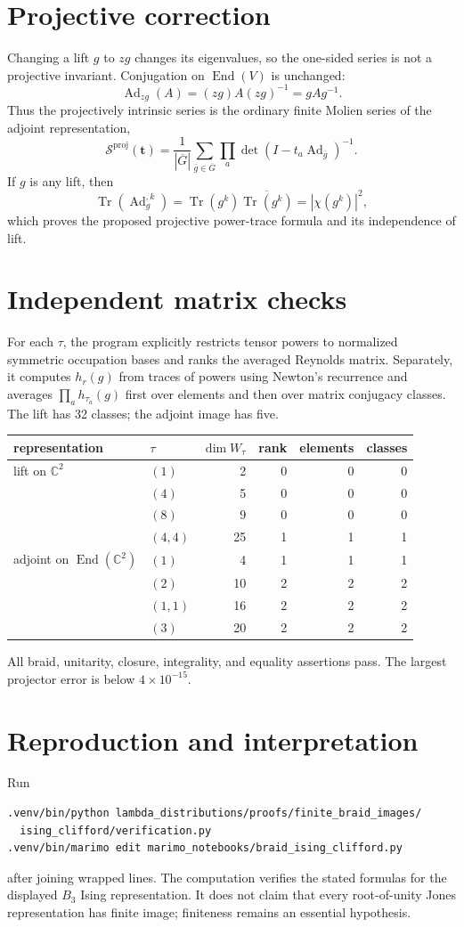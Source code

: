 \documentclass[11pt]{article}
\newcommand{\Sgm}{\mathcal S}
\begin{document}
\section{Projective correction}
Changing a lift $g$ to $zg$ changes its eigenvalues, so the one-sided series
is not a projective invariant.  Conjugation on $\operatorname{End}(V)$ is
unchanged:
\[
 \operatorname{Ad}_{zg}(A)=(zg)A(zg)^{-1}=gAg^{-1}.
\]
Thus the projectively intrinsic series is the ordinary finite Molien series
of the adjoint representation,
\[
 \Sgm^{\mathrm{proj}}(\mathbf t)=\frac1{|\overline G|}
 \sum_{\bar g\in\overline G}\prod_a
 \det(I-t_a\operatorname{Ad}_{\bar g})^{-1}.
\]
If $g$ is any lift, then
\[
 \operatorname{Tr}(\operatorname{Ad}_{g}^{,k})
 =\operatorname{Tr}(g^k)\overline{\operatorname{Tr}(g^k)}
 =|\chi(g^k)|^2,
\]
which proves the proposed projective power-trace formula and its independence
of lift.

\section{Independent matrix checks}
For each $\tau$, the program explicitly restricts tensor powers to normalized
symmetric occupation bases and ranks the averaged Reynolds matrix.  Separately,
it computes $h_r(g)$ from traces of powers using Newton's recurrence and
averages $\prod_a h_{\tau_a}(g)$ first over elements and then over matrix
conjugacy classes.  The lift has 32 classes; the adjoint image has five.

\begin{center}
\begin{tabular}{@{}llrrrr@{}}\toprule
representation&$\tau$&$\dim W_\tau$&rank&elements&classes\\\midrule
lift on $\mathbb C^2$&$(1)$&2&0&0&0\\
&$(4)$&5&0&0&0\\
&$(8)$&9&0&0&0\\
&$(4,4)$&25&1&1&1\\\addlinespace
adjoint on $\operatorname{End}(\mathbb C^2)$&$(1)$&4&1&1&1\\
&$(2)$&10&2&2&2\\
&$(1,1)$&16&2&2&2\\
&$(3)$&20&2&2&2\\\bottomrule
\end{tabular}
\end{center}
All braid, unitarity, closure, integrality, and equality assertions pass.  The
largest projector error is below $4\times10^{-15}$.

\section{Reproduction and interpretation}
Run
\begin{verbatim}
.venv/bin/python lambda_distributions/proofs/finite_braid_images/
  ising_clifford/verification.py
.venv/bin/marimo edit marimo_notebooks/braid_ising_clifford.py
\end{verbatim}
after joining wrapped lines.  The computation verifies the stated formulas
for the displayed $B_3$ Ising representation.  It does not claim that every
root-of-unity Jones representation has finite image; finiteness remains an
essential hypothesis.
\end{document}
